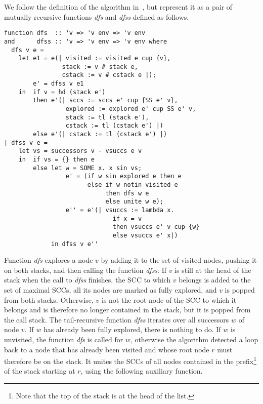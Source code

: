 \documentclass[sigplan,10pt,anonymous,review]{acmart}
\newcommand{\prog}[1]{\textit{#1}}
\begin{document}
We follow the definition of the algorithm in~\cite{bloemen:strong}, but represent it as a pair of mutually recursive functions \prog{dfs} and \prog{dfss} defined as follows.

\begin{small}
\begin{lstlisting}[language=isabelle]
function dfs  :: 'v => 'v env => 'v env
and      dfss :: 'v => 'v env => 'v env where
  dfs v e =
    let e1 = e(| visited := visited e cup {v},
                stack := v # stack e,
                cstack := v # cstack e |);
        e' = dfss v e1
    in  if v = hd (stack e')
        then e'(| sccs := sccs e' cup {SS e' v},
                 explored := explored e' cup SS e' v,
                 stack := tl (stack e'),
                 cstack := tl (cstack e') |)
        else e'(| cstack := tl (cstack e') |)
| dfss v e =
    let vs = successors v - vsuccs e v
    in  if vs = {} then e
        else let w = SOME x. x sin vs;
                 e' = (if w sin explored e then e
                       else if w notin visited e
                            then dfs w e
                            else unite w e);
                 e'' = e'(| vsuccs := lambda x. 
                              if x = v 
                              then vsuccs e' v cup {w}
                              else vsuccs e' x|)
             in dfss v e''
\end{lstlisting}
\end{small}

Function \prog{dfs} explores a node $v$ by adding it to the set of visited nodes, pushing it on both stacks, and then calling the function \prog{dfss}. If $v$ is still at the head of the stack when the call to \prog{dfss} finishes, the SCC to which $v$ belongs is added to the set of maximal SCCs, all its nodes are marked as fully explored, and $v$ is popped from both stacks. Otherwise, $v$ is not the root node of the SCC to which it belongs and is therefore no longer contained in the stack, but it is popped from the call stack. The tail-recursive function \prog{dfss} iterates over all successors $w$ of node $v$. If $w$ has already been fully explored, there is nothing to do. If $w$ is unvisited, the function \prog{dfs} is called for $w$, otherwise the algorithm detected a loop back to a node that has already been visited and whose root node $r$ must therefore be on the stack. It unites the SCCs of all nodes contained in the prefix\footnote{Note that the top of the stack is at the head of the list.} of the stack starting at $r$, using the following auxiliary function.
\end{document}
